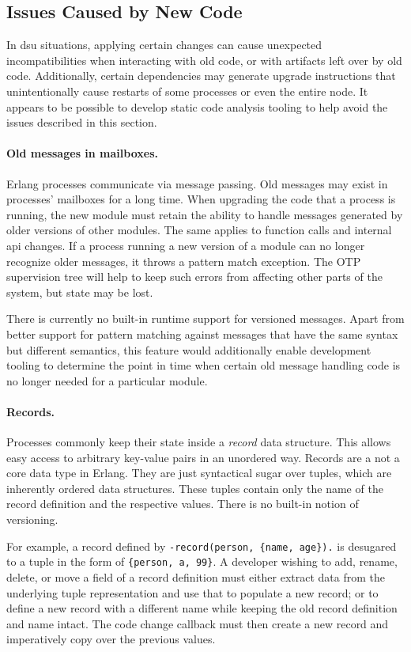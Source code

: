 \cleardoublepage
\subsection{Issues Caused by New Code}

In \acrshort{dsu} situations, applying certain changes can cause unexpected incompatibilities when interacting with old code, or with artifacts left over by old code. Additionally, certain dependencies may generate upgrade instructions that unintentionally cause restarts of some processes or even the entire node. It appears to be possible to develop static code analysis tooling to help avoid the issues described in this section.

\paragraph{Old messages in mailboxes.} Erlang processes communicate via message passing. Old messages may exist in processes' mailboxes for a long time. When upgrading the code that a process is running, the new module must retain the ability to handle messages generated by older versions of other modules. The same applies to function calls and internal \acrshort{api} changes. If a process running a new version of a module can no longer recognize older messages, it throws a pattern match exception. The OTP supervision tree will help to keep such errors from affecting other parts of the system, but state may be lost.

There is currently no built-in runtime support for versioned messages. Apart from better support for pattern matching against messages that have the same syntax but different semantics, this feature would additionally enable development tooling to determine the point in time when certain old message handling code is no longer needed for a particular module.

\paragraph{Records.}
Processes commonly keep their state inside a \emph{record} data structure. This allows easy access to arbitrary key-value pairs in an unordered way. Records are a not a core data type in Erlang. They are just syntactical sugar over tuples, which are inherently ordered data structures. These tuples contain only the name of the record definition and the respective values. There is no built-in notion of versioning.

For example, a record defined by \lstinline|-record(person, {name, age}).| is desugared to a tuple in the form of \lstinline|{person, a, 99}|. A developer wishing to add, rename, delete, or move a field of a record definition must either extract data from the underlying tuple representation and use that to populate a new record; or to define a new record with a different name while keeping the old record definition and name intact. The code change callback must then create a new record and imperatively copy over the previous values.

